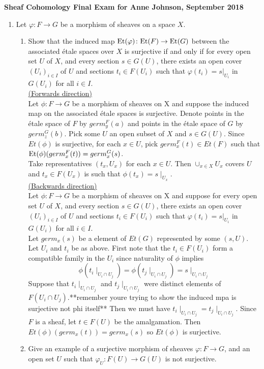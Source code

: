\documentclass{article}
\newcommand{\Et}{\mbox{\rm Et}}
\begin{document}
\begin{center}
{\bf Sheaf Cohomology Final Exam for Anne Johnson, September 2018}
\end{center}

\begin{enumerate}
\item
Let $\varphi\colon F\to G$ be a morphism of sheaves on a space $X$.
\begin{enumerate}
 \item Show that the induced map $\Et(\varphi)\colon\Et(F)\to\Et(G)$ between the associated 
\'etale spaces over $X$ is surjective if and only if for every open set $U$ of $X$, and every section $s\in G(U)$,
there exists an open cover $(U_i)_{i\in I}$ of $U$ and sections $t_i\in F(U_i)$ such that $\varphi(t_i)=s|_{U_i}$ in $G(U_i)$ for all $i\in I$.\\

\underline{(Forwards direction)}\\
Let $\phi:F \rightarrow G$ be a morphism of sheaves on X and suppose the induced map on the associated \'etale spaces is surjective. Denote points in the \'etale space of $F$ by $germ_y^F(a)$ and points in the \'etale space of $G$ by $germ_z^G(b)$. Pick some $U$ an open subset of $X$ and $s \in G(U)$. Since $Et(\phi)$ is surjective, for each $x \in U$, pick $germ_x^F(t) \in Et(F)$ such that $\Et(\phi)(germ_x^F(t)) = germ_x^G(s)$.  \\
Take representatives $(t_x, U_x)$ for each $x \in U$. Then $\cup_{x \in X} U_x$ covers $U$ and $t_x \in F(U_x)$ is such that $\phi(t_x) = s\mid_{U_x}$.\\

\underline{(Backwards direction)}\\
Let $\phi:F \rightarrow G$ be a morphism of sheaves on X and suppose for every open set $U$ of $X$, and every section $s\in G(U)$, there exists an open cover $(U_i)_{i\in I}$ of $U$ and sections $t_i\in F(U_i)$ such that $\varphi(t_i)=s|_{U_i}$ in $G(U_i)$ for all $i\in I$. \\
Let $germ_x(s)$ be a element of $Et(G)$ represented by some $(s,U)$. Let $U_i$ and $t_i$ be as above. First note that the $t_i \in F(U_i)$ form a compatible family in the $U_i$ since naturality of $\phi$ implies
\[\phi(t_i\mid_{U_i\cap U_j}) = \phi(t_j\mid_{U_i\cap U_j}) = s\mid_{U_i \cap U_j}\] 
Suppose that $t_i\mid_{U_i\cap U_j}$ and $t_j\mid_{U_i\cap U_j}$ were distinct elements of $F(U_i \cap U_j)$.**remember youre trying to show the induced mpa is surjective not phi itself** Then we must have $t_i\mid_{U_i \cap U_j} = t_j\mid_{U_i \cap U_j}$. Since $F$ is a sheaf, let $t \in F(U)$ be the amalgamation. Then $Et(\phi)(germ_x(t)) = germ_x(s)$ so $Et(\phi)$ is surjective.\\
\newpage
\item Give an example of a surjective morphism of sheaves $\varphi\colon F\to G$, and an open set $U$ such that $\varphi_U\colon F(U)\to G(U)$ is not surjective.\\


\end{enumerate}
\end{enumerate}
\end{document}
